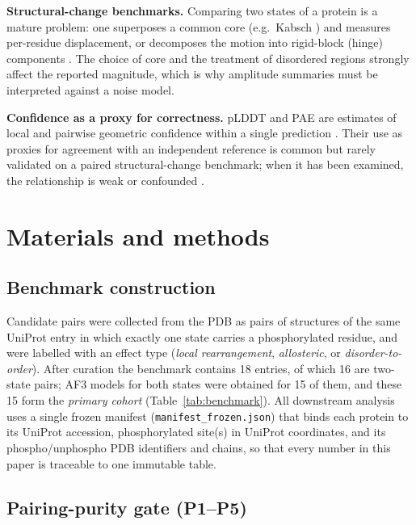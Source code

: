 \noindent\textbf{Structural-change benchmarks.} Comparing two states of a
protein is a mature problem: one superposes a common core (e.g.\ Kabsch
\citep{kabsch1976solution}) and measures per-residue displacement, or decomposes
the motion into rigid-block (hinge) components \citep{hayward1998systematic}. The
choice of core and the treatment of disordered regions strongly affect the
reported magnitude, which is why amplitude summaries must be interpreted
against a noise model.

\noindent\textbf{Confidence as a proxy for correctness.} pLDDT and PAE are
estimates of local and pairwise geometric confidence within a single
prediction \citep{abramson2024alphafold3}. Their use as proxies for agreement with an
independent reference is common but rarely validated on a paired
structural-change benchmark; when it has been examined, the relationship
is weak or confounded \citep{carugo2023plddt,akdel2022structural}.

\section{Materials and methods}
\label{sec:methods}

\subsection{Benchmark construction}
\label{sec:bench-construction}

Candidate pairs were collected from the PDB as pairs of structures of the
same UniProt entry in which exactly one state carries a phosphorylated
residue, and were labelled with an effect type (\emph{local
rearrangement}, \emph{allosteric}, or \emph{disorder-to-order}). After
curation the benchmark contains 18 entries, of which 16 are two-state
pairs; AF3 models for both states were obtained for 15 of them, and these
15 form the \emph{primary cohort} (Table~\ref{tab:benchmark}).
All downstream analysis uses a single frozen manifest
(\texttt{manifest\_frozen.json}) that binds each protein to its UniProt
accession, phosphorylated site(s) in UniProt coordinates, and its
phospho/unphospho PDB identifiers and chains, so that every number in this
paper is traceable to one immutable table.

\subsection{Pairing-purity gate (P1--P5)}
\label{sec:purity}


